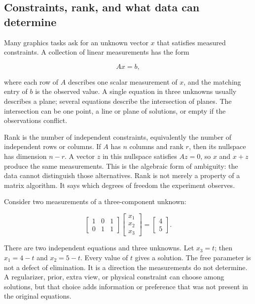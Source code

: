 \subsection{Constraints, rank, and what data can determine}\label{01-foundations-i-ch019-constraints-rank-and-what-data-can-determine}

Many graphics tasks ask for an unknown vector \(x\) that satisfies measured constraints. A collection of linear measurements has the form

\[
Ax=b,
\]

where each row of \(A\) describes one scalar measurement of \(x\), and the matching entry of \(b\) is the observed value. A single equation in three unknowns usually describes a plane; several equations describe the intersection of planes. The intersection can be one point, a line or plane of solutions, or empty if the observations conflict.

Rank is the number of independent constraints, equivalently the number of independent rows or columns. If \(A\) has \(n\) columns and rank \(r\), then its nullspace has dimension \(n-r\). A vector \(z\) in this nullspace satisfies \(Az=0\), so \(x\) and \(x+z\) produce the same measurements. This is the algebraic form of ambiguity: the data cannot distinguish those alternatives. Rank is not merely a property of a matrix algorithm. It says which degrees of freedom the experiment observes.

Consider two measurements of a three-component unknown:

\[
\begin{bmatrix}1&0&1\\0&1&1\end{bmatrix}
\begin{bmatrix}x_1\\x_2\\x_3\end{bmatrix}
=
\begin{bmatrix}4\\5\end{bmatrix}.
\]

There are two independent equations and three unknowns. Let \(x_3=t\); then \(x_1=4-t\) and \(x_2=5-t\). Every value of \(t\) gives a solution. The free parameter is not a defect of elimination. It is a direction the measurements do not determine. A regularizer, prior, extra view, or physical constraint can choose among solutions, but that choice adds information or preference that was not present in the original equations.

